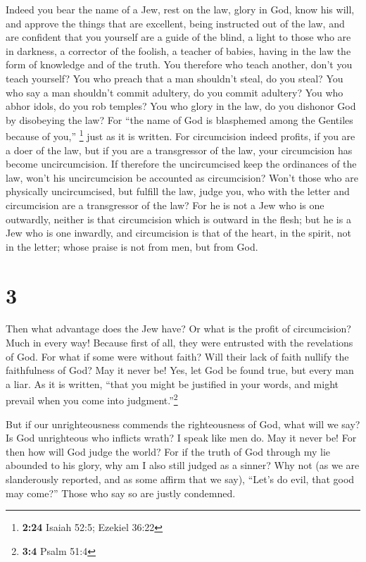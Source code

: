  Indeed you bear the name of a Jew, rest on the law,
glory in God,  know his will, and approve the things that
are excellent, being instructed out of the law,  and are
confident that you yourself are a guide of the blind, a light to those
who are in darkness,  a corrector of the foolish, a
teacher of babies, having in the law the form of knowledge and of the
truth.  You therefore who teach another, don't you teach
yourself? You who preach that a man shouldn't steal, do you steal?
 You who say a man shouldn't commit adultery, do you
commit adultery? You who abhor idols, do you rob temples?
 You who glory in the law, do you dishonor God by
disobeying the law?  For ``the name of God is blasphemed
among the Gentiles because of you,'' \footnote{\textbf{2:24} Isaiah
  52:5; Ezekiel 36:22} just as it is written.  For
circumcision indeed profits, if you are a doer of the law, but if you
are a transgressor of the law, your circumcision has become
uncircumcision.  If therefore the uncircumcised keep the
ordinances of the law, won't his uncircumcision be accounted as
circumcision?  Won't those who are physically
uncircumcised, but fulfill the law, judge you, who with the letter and
circumcision are a transgressor of the law?  For he is
not a Jew who is one outwardly, neither is that circumcision which is
outward in the flesh;  but he is a Jew who is one
inwardly, and circumcision is that of the heart, in the spirit, not in
the letter; whose praise is not from men, but from God.

\hypertarget{section-2}{%
\section{3}\label{section-2}}

 Then what advantage does the Jew have? Or what is the
profit of circumcision?  Much in every way! Because first
of all, they were entrusted with the revelations of God. 
For what if some were without faith? Will their lack of faith nullify
the faithfulness of God?  May it never be! Yes, let God be
found true, but every man a liar. As it is written, ``that you might be
justified in your words, and might prevail when you come into
judgment.''\footnote{\textbf{3:4} Psalm 51:4}

 But if our unrighteousness commends the righteousness of
God, what will we say? Is God unrighteous who inflicts wrath? I speak
like men do.  May it never be! For then how will God judge
the world?  For if the truth of God through my lie
abounded to his glory, why am I also still judged as a sinner?
 Why not (as we are slanderously reported, and as some
affirm that we say), ``Let's do evil, that good may come?'' Those who
say so are justly condemned.

